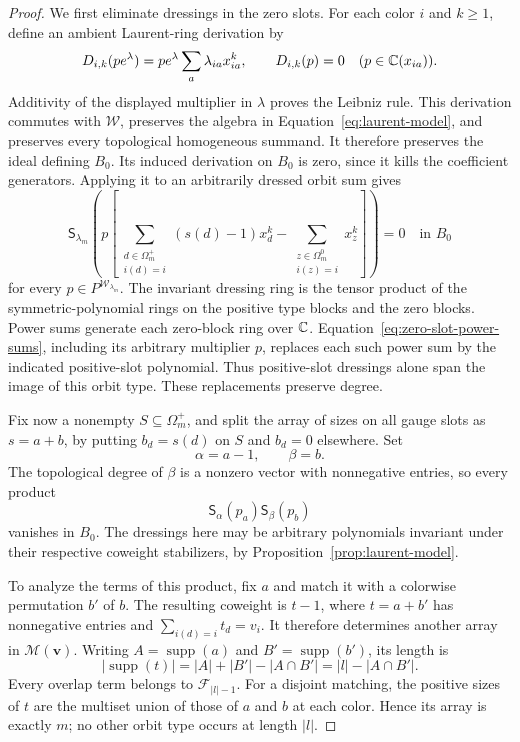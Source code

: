 \begin{proof}
We first eliminate dressings in the zero slots.  For each color $i$
and $k\geq1$, define an ambient Laurent-ring derivation by
\[
 D_{i,k}(p e^\lambda)
 =p e^\lambda\sum_a\lambda_{ia}x_{ia}^k,
 \qquad D_{i,k}(p)=0\quad(p\in\mathbb C(x_{ia})).
\]
Additivity of the displayed multiplier in $\lambda$ proves the
Leibniz rule.  This derivation commutes with $\mathcal W$, preserves
the algebra in Equation~\eqref{eq:laurent-model}, and preserves every
topological homogeneous summand.  It therefore preserves the ideal
defining $B_0$.  Its induced derivation on $B_0$ is zero, since it
kills the coefficient generators.  Applying it to an arbitrarily
dressed orbit sum gives
\begin{equation}\label{eq:zero-slot-power-sums}
 \mathsf S_{\lambda_m}\left(
 p\left[
 \sum_{\substack{d\in\Omega_m^+\\i(d)=i}}
                   (s(d)-1)x_d^k
 -\sum_{\substack{z\in\Omega_m^0\\i(z)=i}}x_z^k
 \right]\right)=0\quad\text{in }B_0
\end{equation}
for every $p\in P^{\mathcal W_{\lambda_m}}$.  The invariant dressing
ring is the tensor product of the symmetric-polynomial rings on the
positive type blocks and the zero blocks.  Power sums generate each
zero-block ring over $\mathbb C$.  Equation~\eqref{eq:zero-slot-power-sums},
including its arbitrary multiplier $p$, replaces each such power sum
by the indicated positive-slot polynomial.  Thus positive-slot
dressings alone span the image of this orbit type.  These replacements
preserve degree.

Fix now a nonempty $S\subseteq\Omega_m^+$, and split the array of
sizes on all gauge slots as $s=a+b$, by putting $b_d=s(d)$ on $S$ and
$b_d=0$ elsewhere.  Set
\[
 \alpha=a-1,\qquad \beta=b.
\]
The topological degree of $\beta$ is a nonzero vector with
nonnegative entries, so every product
\[
 \mathsf S_\alpha(p_a)\mathsf S_\beta(p_b)
\]
vanishes in $B_0$.  The dressings here may be arbitrary polynomials
invariant under their respective coweight stabilizers, by
Proposition~\ref{prop:laurent-model}.

To analyze the terms of this product, fix $a$ and match it with a
colorwise permutation $b'$ of $b$.  The resulting coweight is $t-1$,
where $t=a+b'$ has nonnegative entries and $\sum_{i(d)=i}t_d=v_i$.
It therefore determines another array in $\mathcal M(\mathbf v)$.
Writing $A=\operatorname{supp}(a)$ and
$B'=\operatorname{supp}(b')$, its length is
\[
 |\operatorname{supp}(t)|
 =|A|+|B'|-|A\cap B'|=|l|-|A\cap B'|.
\]
Every overlap term belongs to $\mathcal F_{|l|-1}$.  For a disjoint
matching, the positive sizes of $t$ are the multiset union of those
of $a$ and $b$ at each color.  Hence its array is exactly $m$; no
other orbit type occurs at length $|l|$.


\end{proof}
